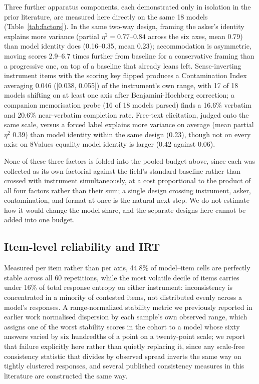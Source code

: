 \documentclass[12pt]{article}
\begin{document}
Three further apparatus components, each demonstrated only in isolation in
the prior literature, are measured here directly on the same 18 models
(Table~\ref{tab:factors}). In the same
two-way design, framing the asker's identity explains more variance
(partial $\eta^2=0.77$--$0.84$ across the six axes, mean 0.79) than model
identity does (0.16--0.35, mean 0.23); accommodation is asymmetric, moving scores
2.9--6.7 times further from baseline for a conservative framing than a
progressive one, on top of a baseline that already leans left. Sense-inverting
instrument items with the scoring key flipped produces a Contamination
Index averaging 0.046 ([0.038, 0.055]) of the instrument's own range, with
17 of 18 models shifting on at least one axis after Benjamini-Hochberg
correction; a companion memorisation probe (16 of 18 models parsed) finds a
16.6\% verbatim and 20.6\% near-verbatim completion rate. Free-text
elicitation, judged onto the same scale, versus a forced label explains
more variance on average (mean partial $\eta^2$ 0.39) than model identity
within the same design (0.23), though not on every axis: on 8Values
equality model identity is larger (0.42 against 0.06).

None of these three factors is folded into the pooled budget above, since
each was collected as its own factorial against the field's standard
baseline rather than crossed with instrument simultaneously, at a cost
proportional to the product of all four factors rather than their sum; a
single design crossing instrument, asker, contamination, and format at once
is the natural next step. We do not estimate how it would change the model
share, and the separate designs here cannot be added into one budget.

\subsection{Item-level reliability and IRT}
\label{sec:irt}

Measured per item rather than per axis, 44.8\% of model--item cells are
perfectly stable across all 60 repetitions, while the most volatile decile
of items carries under 16\% of total response entropy on either
instrument: inconsistency is concentrated in a minority of contested
items, not distributed evenly across a model's responses. A
range-normalized stability metric we previously reported in earlier work
normalised dispersion by each sample's own observed range, which assigns
one of the worst stability scores in the cohort to a model whose sixty
answers varied by six hundredths of a point on a twenty-point scale; we
report that failure explicitly here rather than quietly replacing it,
since any scale-free consistency statistic that divides by observed spread
inverts the same way on tightly clustered responses, and several published
consistency measures in this literature are constructed the same way.
\end{document}
